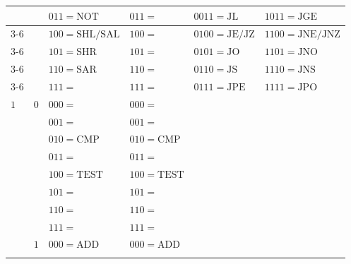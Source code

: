 \begin{table}[H]
{\begin{tabular}{|l|l||l|l|l|l|}
                                              &                                          & $011=\text{NOT}$ & $011=$ & $0011=\text{JL}$ & $1011=\text{JGE}$ \\ \cline{3-6}
                                              &                                          & $100=\text{SHL/SAL}$ & $100=$ & $0100=\text{JE/JZ}$ & $1100=\text{JNE/JNZ}$ \\ \cline{3-6}
                                              &                                          & $101=\text{SHR}$ & $101=$ & $0101=\text{JO}$ & $1101=\text{JNO}$ \\ \cline{3-6}
                                              &                                          & $110=\text{SAR}$ & $110=$ & $0110=\text{JS}$ & $1110=\text{JNS}$ \\ \cline{3-6}
                                              &                                          & $111=$ & $111=$ & $0111=\text{JPE}$ & $1111=\text{JPO}$ \\ \hline
            \multirow{14}{*}{$1$}             & \multirow{7}{*}{$0$}                     & $000=$ & $000=$ &  &  \\ \cline{3-6}
                                              &                                          & $001=$ & $001=$ &  &  \\ \cline{3-6}
                                              &                                          & $010=\text{CMP}$ & $010=\text{CMP}$ &  &\\ \cline{3-6}
                                              &                                          & $011=$ & $011=$ &  &  \\ \cline{3-6}
                                              &                                          & $100=\text{TEST}$ & $100=\text{TEST}$ &  &  \\ \cline{3-6}
                                              &                                          & $101=$ & $101=$ &  &  \\ \cline{3-6}
                                              &                                          & $110=$ & $110=$ &  & \\ \cline{3-6}
                                              &                                          & $111=$ & $111=$ &  & \\ \cline{2-6}
                                              & \multirow{7}{*}{$1$}                     & $000=\text{ADD}$ & $000=\text{ADD}$ &  &  \\ \cline{3-6}

\end{tabular}}
\end{table}
